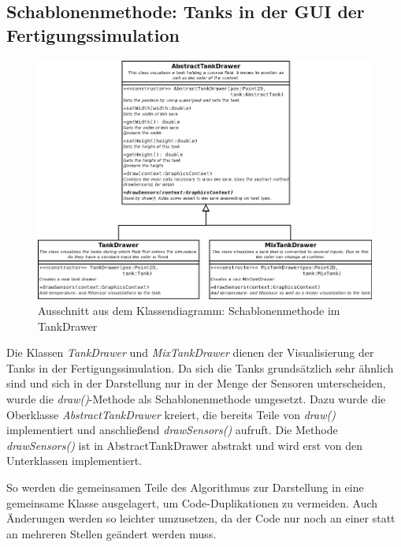 \documentclass[parskip=full]{scrartcl}
\begin{document}
\subsection{Schablonenmethode: Tanks in der GUI der Fertigungssimulation}
\begin{figure}[H]
  \centering
  \includegraphics[scale=0.4]{design/pattern-screenshots/template-TankDrawer.png}
  \caption{Ausschnitt aus dem Klassendiagramm: Schablonenmethode im TankDrawer}
\end{figure}
Die Klassen \emph{TankDrawer} und \emph{MixTankDrawer} dienen der Visualisierung der Tanks in der Fertigungssimulation. Da sich die Tanks grunds\"atzlich
sehr \"ahnlich sind und sich in der Darstellung nur in der Menge der Sensoren unterscheiden, wurde die \emph{draw()}-Methode als Schablonenmethode umgesetzt.
Dazu wurde die Oberklasse \emph{AbstractTankDrawer} kreiert, die bereits Teile von \emph{draw()} implementiert und anschlie{\ss}end \emph{drawSensors()}
aufruft. Die Methode \emph{drawSensors()} ist in AbstractTankDrawer abstrakt und wird erst von den Unterklassen implementiert.

So werden die gemeinsamen Teile des Algorithmus zur Darstellung in eine gemeinsame Klasse ausgelagert, um Code-Duplikationen zu vermeiden. Auch \"Anderungen
werden so leichter umzusetzen, da der Code nur noch an einer statt an mehreren Stellen ge\"andert werden muss.

\pagebreak
\end{document}
